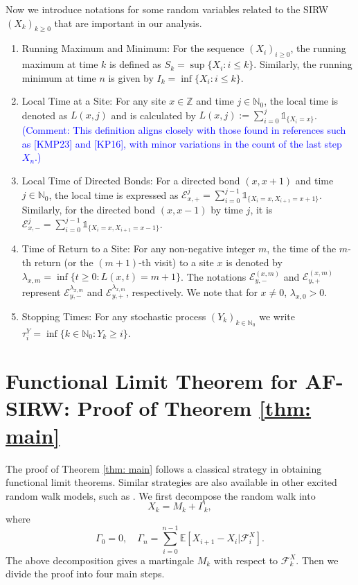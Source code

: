 \documentclass[twoside,12pt, a4paper]{article}
\numberwithin{equation}{section}
\theoremstyle{remark}
\newcommand{\comment}[1]{\textcolor{blue}{(Comment: #1)}}
\begin{document}
	Now we introduce notations for some random variables related to the SIRW $(X_k)_{k\geq0}$ that are important in our analysis.
	\begin{enumerate}
		\item Running Maximum and Minimum: For the sequence $(X_i)_{i \ge 0}$, the running maximum at time $k$ is defined as $S_k = \sup\{X_i : i \le k\}$. Similarly, the running minimum at time $n$ is given by $I_k = \inf \{X_i: i \le k\}$.
		\item
		Local Time at a Site: For any site $x \in \mathbb{Z}$ and time $j \in \mathbb{N}_0$, the local time is denoted as $L(x,j)$ and is calculated by $L(x,j):= \sum_{i=0}^j \mathbb{1}_{\{X_i=x\}}$. 
		\comment{This definition aligns closely with those found in references such as [KMP23] and [KP16], with minor variations in the count of the last step $X_n$.}
		\item
		Local Time of Directed Bonds: For a directed bond $(x,x+1)$ and time $j \in \mathbb{N}_0$, the local time is expressed as $\mathcal{E}^j_{x,+} = \sum_{i=0}^{j-1} \mathbb{1}_{\{X_i=x, X_{i+1} =x+1\}}$. Similarly, for the directed bond $(x,x-1)$ by time $j$, it is $\mathcal{E}^j_{x,-} = \sum_{i=0}^{j-1} \mathbb{1}_{\{X_i=x, X_{i+1} =x-1\}}$.
		\item
		Time of Return to a Site: For any non-negative integer $m$, the time of the $m$-th return (or the $(m+1)$-th visit) to a site $x$ is denoted by $\lambda_{x,m} = \inf\{t \geq 0: L(x,t) = m+1\}$. The notations $\mathcal{E}^{(x,m)}_{y, -}$ and $\mathcal{E}^{(x,m)}_{y, +}$ represent $\mathcal{E}^{\lambda_{x,m}}_{y,-}$ and $\mathcal{E}^{\lambda_{x,m}}_{y,+}$, respectively. We note that for $x\neq 0$, $\lambda_{x,0} > 0$.
		\item
		Stopping Times: For any stochastic process $(Y_k)_{k \in \mathbb{N}_0}$ we write $\tau^Y_{i} = \inf \{k \in  \mathbb{N}_0: Y_k \ge  i\}$.
	\end{enumerate}
	\section{Functional Limit Theorem for AF-SIRW: Proof of Theorem \ref{thm: main}}
	\label{sec: proof of main}
	
	The proof of Theorem \ref{thm: main} follows a classical strategy in obtaining functional limit theorems. 
	Similar strategies are also available in other excited random walk models, such as \cite{KP16,KMP23}.
	We first decompose the random walk into
	\begin{equation}
		\label{eqn:decomposition}
		X_k = M_k+ \Gamma_k 
		,\end{equation} 
	where
	\[ 
	\Gamma_0 = 0, \quad \Gamma_n = \sum_{i=0}^{n-1} \mathbb{E}\left[ X_{i+1}-X_i | \mathcal{F}_i^X 
	\right].
	\]
	The above decomposition gives a martingale $M_k$ with respect to $\mathcal{F}_k^X.$ 
	Then we divide the proof into four main steps. 
	
\end{document}

